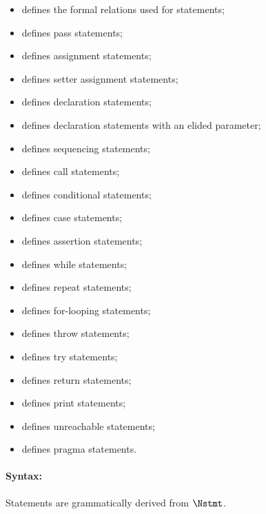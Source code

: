\ChapterOutline
\begin{itemize}
  \item {} defines the formal relations used for statements;
  \item {} defines pass statements;
  \item {} defines assignment statements;
  \item {} defines setter assignment statements;
  \item {} defines declaration statements;
  \item {} defines declaration statements with an elided parameter;
  \item {} defines sequencing statements;
  \item {} defines call statements;
  \item {} defines conditional statements;
  \item {} defines case statements;
  \item {} defines assertion statements;
  \item {} defines while statements;
  \item {} defines repeat statements;
  \item {} defines for-looping statements;
  \item {} defines throw statements;
  \item {} defines try statements;
  \item {} defines return statements;
  \item {} defines print statements;
  \item {} defines unreachable statements;
  \item {} defines pragma statements.
\end{itemize}

\paragraph{Syntax:} Statements are grammatically derived from $\Nstmt$.

